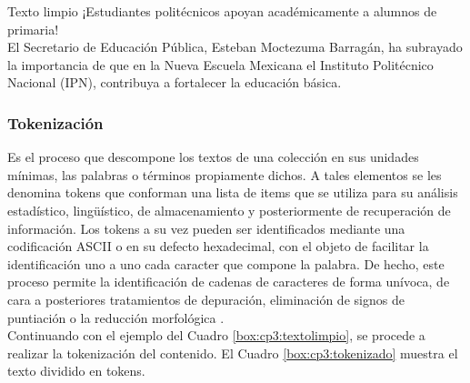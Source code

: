 \begin{mygraybox}[label={box:cp3:textolimpio}]{Texto limpio} 
¡Estudiantes politécnicos apoyan académicamente a alumnos de primaria!\\

El Secretario de Educación Pública, Esteban Moctezuma Barragán, ha subrayado la importancia  de que en la Nueva Escuela Mexicana el Instituto Politécnico Nacional (IPN), contribuya a fortalecer la educación básica.
\end{mygraybox}



\subsubsection{Tokenización}

Es el proceso que descompone los textos de una colección en sus unidades mínimas, las palabras
o términos propiamente dichos. A tales elementos se les denomina tokens que conforman una lista de
items que se utiliza para su análisis estadístico, ling{\"u}ístico, de almacenamiento y posteriormente de
recuperación de información. Los tokens a su vez pueden ser identificados mediante una codificación
ASCII o en su defecto hexadecimal, con el objeto de facilitar la identificación uno a uno cada caracter
que compone la palabra. De hecho, este proceso permite la identificación de cadenas de caracteres de
forma unívoca, de cara a posteriores tratamientos de depuración, eliminación de signos de puntiación
o la reducción morfológica \citep{CT12}.\\

Continuando con el ejemplo del Cuadro \ref{box:cp3:textolimpio}, se procede a realizar la tokenización del contenido. El Cuadro \ref{box:cp3:tokenizado} muestra el texto dividido en tokens.\\

